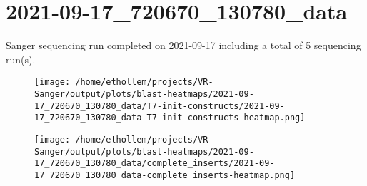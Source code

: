 \section{2021-09-17\_720670\_130780\_data}

    Sanger sequencing run completed on 2021-09-17
    including a total of 5 sequencing
    run(s).
    

    \begin{figure}[!h]
        \texttt{[image: /home/ethollem/projects/VR-Sanger/output/plots/blast-heatmaps/2021-09-17\_720670\_130780\_data/T7-init-constructs/2021-09-17\_720670\_130780\_data-T7-init-constructs-heatmap.png]}
        \centering
    \end{figure}


    \begin{figure}[!h]
        \texttt{[image: /home/ethollem/projects/VR-Sanger/output/plots/blast-heatmaps/2021-09-17\_720670\_130780\_data/complete\_inserts/2021-09-17\_720670\_130780\_data-complete\_inserts-heatmap.png]}
        \centering
    \end{figure}

\pagebreak